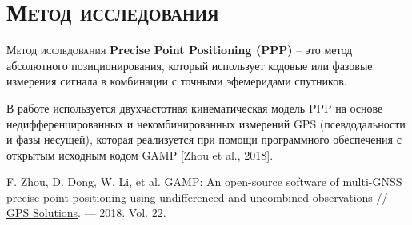 \section{\textsc{Метод исследования}}

\begin{frame}{\textsc{Метод исследования}}
\textbf{Precise Point Positioning (PPP)} – это метод абсолютного позиционирования, который использует кодовые или фазовые измерения сигнала в комбинации с точными эфемеридами спутников.

\vspace{1em}
В работе используется двухчастотная кинематическая модель PPP на основе недифференцированных и некомбинированных измерений GPS (псевдодальности и фазы несущей), которая реализуется при помощи программного обеспечения с открытым исходным кодом GAMP [Zhou et al., 2018].

\vspace{1em}
F. Zhou, D. Dong, W. Li, et al. GAMP: An open-source software of multi-GNSS precise point positioning using undifferenced and uncombined observations // \href{http://dx.doi.org/10.1007/s10291-018-0699-9}{GPS Solutions}. --- 2018. Vol. 22. 
\end{frame}

